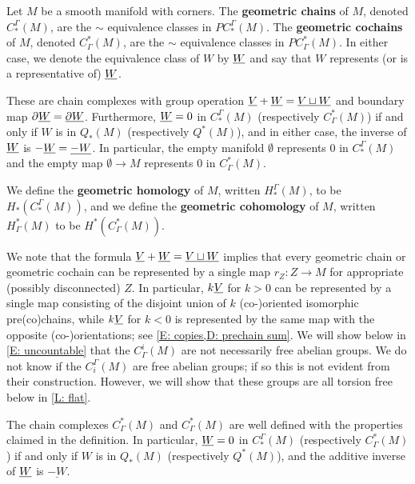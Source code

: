 \begin{definition}\label{D: chains and cochains}
	Let $M$ be a smooth manifold with corners.
	The \textbf{geometric chains} of $M$, denoted $C^\Gamma_*(M)$, are the $\sim$ equivalence classes in $PC^\Gamma_*(M)$.
	The \textbf{geometric cochains} of $M$, denoted $C_\Gamma^*(M)$, are the $\sim$ equivalence classes in $PC_\Gamma^*(M)$.
	In either case, we denote the equivalence class of $W$ by $\underline{W}$ and say that $W$ represents (or is a representative of) $\underline{W}$.

	These are chain complexes with group operation $\underline{V} + \underline{W} = \underline{V \sqcup W}$ and boundary map $\partial \underline{W} = \underline{\partial W}$.
	Furthermore, $\underline{W} = 0$ in $C^\Gamma_*(M)$ (respectively $C_\Gamma^*(M)$) if and only if $W$ is in $Q_*(M)$ (respectively $Q^*(M)$), and in either case, the inverse of $\underline{W}$ is $-\underline{W} = \underline{-W}$.
	In particular, the empty manifold $\emptyset$ represents $0$ in $C^\Gamma_*(M)$ and the empty map $\emptyset \to M$ represents $0$ in $C^*_\Gamma(M)$.

	We define the \textbf{geometric homology} of $M$, written $H_*^\Gamma(M)$, to be $H_*(C^\Gamma_*(M))$, and
	we define the \textbf{geometric cohomology} of $M$, written $H^*_\Gamma(M)$ to be $H^*(C_\Gamma^*(M))$.
\end{definition}

We note that the formula $\underline{V} + \underline{W} = \underline{V \sqcup W}$ implies that every geometric chain or geometric cochain can be represented by a single map $r_Z \colon Z \to M$ for appropriate (possibly disconnected) $Z$.
In particular, $k \underline{V}$ for $k>0$ can be represented by a single map consisting of the disjoint union of $k$ (co-)oriented isomorphic pre(co)chains, while $k \underline{V}$ for $k<0$ is represented by the same map with the opposite (co-)orientations; see \cref{E: copies,D: prechain sum}.
We will show below in \cref{E: uncountable} that the $C^i_\Gamma(M)$ are not necessarily free abelian groups.
We do not know if the $C^\Gamma_i(M)$ are free abelian groups; if so this is not evident from their construction.
However, we will show that these groups are all torsion free below in \cref{L: flat}.


\begin{lemma}\label{L: co/chains well defined}
	The chain complexes $C_\Gamma^*(M)$ and $C_\Gamma^*(M)$ are well defined with the properties claimed in the definition.
	In particular, $\underline{W} = 0$ in $C^\Gamma_*(M)$ (respectively $C_\Gamma^*(M)$) if and only if $W$ is in $Q_*(M)$ (respectively $Q^*(M)$), and the additive inverse of $\underline{W}$ is $\underline{-W}$.
\end{lemma}

